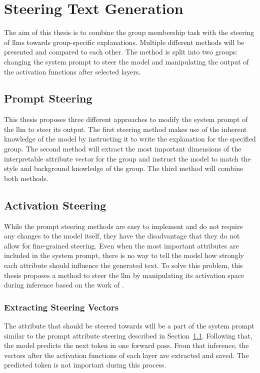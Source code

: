 \section{Steering Text Generation}
\label{sec:approach:steering}
The aim of this thesis is to combine the group membership task with the steering of \aclp{llm} towards group-specific explanations. Multiple different methods will be presented and compared to each other. The method is split into two groups: changing the system prompt to steer the model and manipulating the output of the activation functions after selected layers.

\subsection{Prompt Steering}
\label{sec:approach:steering:prompt}
This thesis proposes three different approaches to modify the system prompt of the \ac{llm} to steer its output. The first steering method makes use of the inherent knowledge of the model by instructing it to write the explanation for the specified group. The second method will extract the most important dimensions of the interpretable attribute vector for the group and instruct the model to match the style and background knowledge of the group. The third method will combine both methods.


\subsection{Activation Steering}
\label{sec:approach:steering:activation}
While the prompt steering methods are easy to implement and do not require any changes to the model itself, they have the disadvantage that they do not allow for fine-grained steering. Even when the most important attributes are included in the system prompt, there is no way to tell the model how strongly each attribute should influence the generated text. To solve this problem, this thesis proposes a method to steer the \ac{llm} by manipulating its activation space during inference based on the work of \citet{konenStyleVectorsSteering2024,turnerActivationAdditionSteering2024,rimsky-etal-2024-steering}.

\subsubsection{Extracting Steering Vectors}
The attribute that should be steered towards will be a part of the system prompt similar to the prompt attribute steering described in Section~\ref{sec:approach:steering:prompt}. Following that, the model predicts the next token in one forward pass. From that inference, the vectors after the activation functions of each layer are extracted and saved. The predicted token is not important during this process. %

